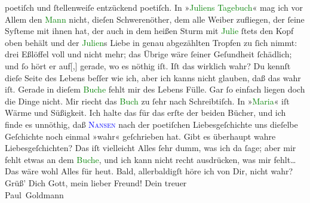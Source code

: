                poetiſch und ſtellenweiſe entzückend poetiſch. {\pb}In
                  »\textcolor{green}{Juliens Tagebuch}{}\ledrightnote{\textcolor{green}{Julies Tagebuch. Roman}}« mag ich vor Allem den \textcolor{green}{Mann}{} nicht, dieſen
               Schwerenöther, dem alle Weiber zufliegen, der ſeine Syſteme mit ihnen hat, der  auch in dem heißen Sturm mit \textcolor{green}{Julie}{} ſtets den Kopf oben behält und der \textcolor{green}{Julien}{}s Liebe in genau abgezählten Tropfen zu ſich nimmt:
               drei Eßlöffel voll und nicht mehr; das Übrige  wäre ſeiner Geſundheit ſchädlich; und ſo hört er auf{[},{]}
               gerade, wo es nöthig iſt. Iſt das wirklich wahr? Du kennſt dieſe Seite des Lebens
               beſſer wie ich, {\pb}aber ich kanns nicht glauben, daß das
               wahr iſt. Gerade in dieſem \textcolor{green}{Buche}{} fehlt mir  des Lebens
               Fülle. Gar ſo einfach liegen doch die Dinge nicht. Mir  riecht  das
                  \textcolor{green}{Buch}{} zu ſehr nach  Schreibtiſch. In »\textcolor{green}{Maria}{}\ledrightnote{\textcolor{green}{Maria. Ein Buch der Liebe}}« iſt Wärme und Süßigkeit. Ich halte das für das erſte
               der beiden Bücher, und ich finde es unnöthig, daß \textsc{\textcolor{blue}{Nansen}{}\ledrightnote{\textcolor{blue}{Peter Nansen}}} nach der poetiſchen Liebesgeſchichte uns dieſelbe Geſchichte noch einmal »wahr«
               geſchrieben hat. Gibt es überhaupt {\pb}wahre
               Liebesgeſchichten? {\dotsfive} Das iſt vielleicht Alles ſehr  dumm, was ich da ſage; aber mir fehlt etwas an dem
                  \textcolor{green}{Buche}{}, und ich kann nicht
               recht ausdrücken, was mir fehlt{\dots}\pend
           \pstart
           Das wäre wohl Alles für heut. Bald, allerbaldigſt höre
               ich von Dir, nicht wahr?\pend
           \pstart
           Grüß’ Dich Gott, mein lieber Freund!\pend
           \pstart
           Dein treuer {\\[\baselineskip]}\spacefill\mbox{Paul Goldmann}\pend
